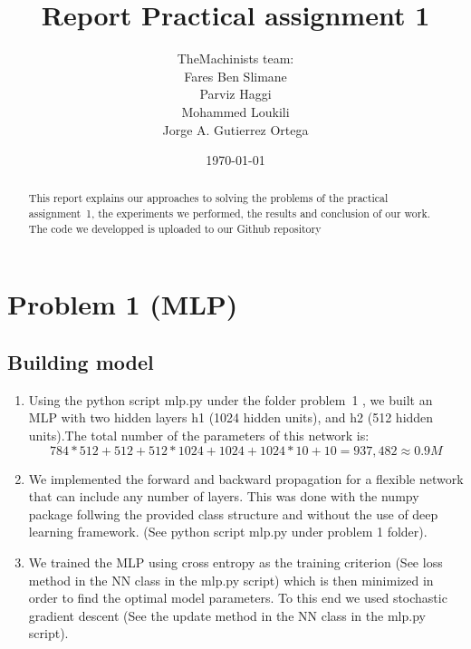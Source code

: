 \documentclass[a4paper]{article}
\title{Report Practical assignment 1}
\author{TheMachinists team:\vspace{0.5cm}\\
Fares Ben Slimane \\
Parviz Haggi \\
Mohammed Loukili \\
Jorge A. Gutierrez Ortega
}
\date{\today}
\begin{document}
\maketitle

\begin{abstract}
This report explains our approaches to solving the problems of the practical assignment~1, the experiments we performed, the results and conclusion of our work. The code we developped is uploaded to our Github repository \cite{github}
\end{abstract}

\section{Problem 1 (MLP)}
\label{sec:problem1}

\subsection{Building model}

\begin{enumerate}
  \item Using the python script mlp.py under the folder problem~1  \cite{github}, we built an MLP with two hidden layers h1 (1024 hidden units), and h2 (512 hidden units).The total number of the parameters of this network is: 
  $$ 784*512 + 512 + 512*1024 + 1024 + 1024*10 + 10 = 937,482 \approx 0.9 M$$
  
  \item We implemented the forward and backward propagation for a flexible network that can include  any number of layers. This was done with the numpy package follwing the provided class structure and without the use of deep learning framework. (See python script mlp.py under problem 1 folder).
  
  \item We trained the MLP using cross entropy as the training criterion (See loss method in the NN class in the mlp.py script) which is then minimized in order to find the optimal model parameters. To this end we used  stochastic gradient descent (See the update method in the NN class in the mlp.py script). 
  
\end{enumerate}
\end{document}
